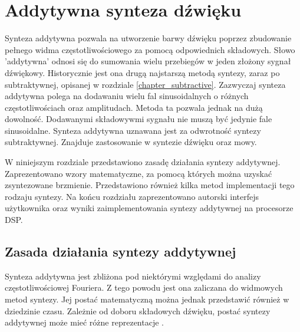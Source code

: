 \chapter{Addytywna synteza dźwięku}\label{chapter_additive}
Synteza addytywna pozwala na utworzenie barwy dźwięku poprzez zbudowanie pełnego widma częstotliwościowego za pomocą odpowiednich składowych. Słowo 'addytywna' odnosi się do sumowania wielu przebiegów w jeden złożony sygnał dźwiękowy. Historycznie jest ona drugą najstarszą metodą syntezy, zaraz po subtraktywnej, opisanej w rozdziale \ref{chapter_subtractive}.
Zazwyczaj synteza addytywna polega na dodawaniu wielu fal sinusoidalnych o różnych częstotliwościach oraz amplitudach. Metoda ta pozwala jednak na dużą dowolność. Dodawanymi składowywmi sygnału nie muszą być jedynie fale sinusoidalne.
Synteza addytywna uznawana jest za odwrotność syntezy subtraktywnej. Znajduje zastosowanie w syntezie dźwięku oraz mowy.

W niniejszym rozdziale przedstawiono zasadę działania syntezy addytywnej. Zaprezentowano wzory matematyczne, za pomocą których można uzyskać zsyntezowane brzmienie. Przedstawiono również kilka metod implementacji tego rodzaju syntezy. Na końcu rozdziału zaprezentowano autorski interfejs użytkownika oraz wyniki zaimplementowania syntezy addytywnej na procesorze DSP.

\section{Zasada działania syntezy addytywnej}
Synteza addytywna jest zbliżona pod niektórymi względami do analizy częstotliwościowej Fouriera. Z tego powodu jest ona zaliczana do widmowych metod syntezy. Jej postać matematyczną można jednak przedstawić również w dziedzinie czasu. Zależnie od doboru składowych dźwięku, postać syntezy addytywnej może mieć różne reprezentacje \cite{add_defins}.

